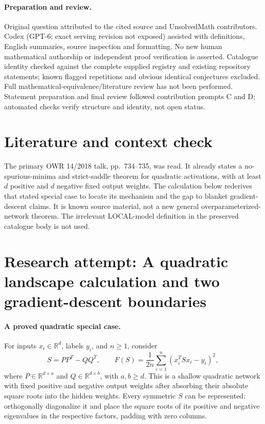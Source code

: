 \documentclass[11pt]{article}
\begin{document}
\paragraph{Preparation and review.}
Original question attributed to the cited source and UnsolvedMath contributors. Codex (GPT-6; exact serving revision not exposed) assisted with definitions, English summaries, source inspection and formatting. No new human mathematical authorship or independent proof verification is asserted. Catalogue identity checked against the complete supplied registry and existing repository statements; known flagged repetitions and obvious identical conjectures excluded. Full mathematical-equivalence/literature review has not been performed. Statement preparation and final review followed contribution prompts C and D; automated checks verify structure and identity, not open status.
\label{end:statement}

\section{Literature and context check}
The primary OWR 14/2018 talk, pp.~734--735, was read. It already states a no-spurious-minima and strict-saddle theorem for quadratic activations, with at least $d$ positive and $d$ negative fixed output weights. The calculation below rederives that stated special case to locate its mechanism and the gap to blanket gradient-descent claims. It is known source material, not a new general overparameterized-network theorem. The irrelevant LOCAL-model definition in the preserved catalogue body is not used.
\section{Research attempt: A quadratic landscape calculation and two gradient-descent boundaries}

\paragraph{A proved quadratic special case.}
For inputs $x_i\in\mathbb R^d$, labels $y_i$, and $n\ge1$, consider
\[
 S=PP^T-QQ^T,\qquad
 F(S)=\frac1{2n}\sum_{i=1}^n(x_i^TSx_i-y_i)^2,
\]
where $P\in\mathbb R^{d\times a}$ and $Q\in\mathbb R^{d\times b}$, with $a,b\ge d$. This is a shallow quadratic network with fixed positive and negative output weights after absorbing their absolute square roots into the hidden weights. Every symmetric $S$ can be represented: orthogonally diagonalize it and place the square roots of its positive and negative eigenvalues in the respective factors, padding with zero columns.
\end{document}
